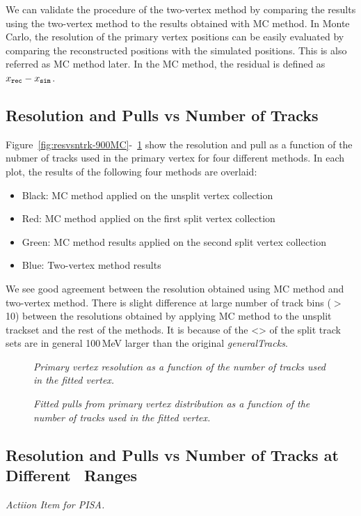 
We can validate the procedure of the two-vertex method by comparing the 
results using the two-vertex method to the results obtained with MC method.
In Monte Carlo, the resolution of the primary vertex positions can be easily 
evaluated by comparing the reconstructed positions with the simulated 
positions. This is also referred as MC method later. In the MC method, 
the residual is defined as $x_{\tt rec}-x_{\tt sim}$. 

\subsection{Resolution and Pulls vs Number of Tracks}

Figure~\ref{fig:resvsntrk-900MC}-~\ref{fig:pullvsntrk-900MC} show 
the resolution and pull as a function of the nubmer of tracks used 
in the primary vertex for four different methods. 
In each plot, the results of the following four methods are overlaid:
\begin{itemize}
\item Black: MC method applied on the unsplit vertex collection
\item Red: MC method applied on the first split vertex collection
\item Green: MC method results applied on the second split vertex collection
\item Blue: Two-vertex method results
\end{itemize}

We see good agreement between the resolution obtained using MC method and 
two-vertex method. There is slight difference at large number of track bins ($>$10) 
between the resolutions obtained by applying MC method to 
the unsplit trackset and the rest of the methods. 
It is because of the <\pt> of the split track sets are in general 
100\,MeV larger than the original {\it generalTracks}. 

\begin{figure}[htb]
\begin{center}
\centerline{
}
\caption{\sl
Primary vertex resolution as a function of the number of tracks used in the fitted vertex. 
}
\label{fig:resvsntrk-900MC}
\end{center}
\begin{center}
\centerline{
}
\caption{\sl
Fitted pulls from primary vertex distribution as a function of the number of tracks used in the 
fitted vertex.}
\label{fig:pullvsntrk-900MC}
\end{center}
\end{figure}


\subsection{Resolution and Pulls vs Number of Tracks at Different \pt\, Ranges}

{\it Actiion Item for PISA.}